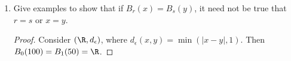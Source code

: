 \documentclass[12pt,letterpaper]{article}
\begin{document}
\begin{enumerate}
\begin{enumerate}
\begin{proof}
Observe that for any $(x', y')\in B_{\frac{\epsilon}{2}}\big((x,y)\big)$,  
\begin{align*}
d(x,x')+d(y,y') = d_p\big((x',y'),(x,y)\big) < \frac{\epsilon}{2},
\end{align*}
so $d(x,x')<\frac{\epsilon}{2}$ and $d(y,y')<\frac{\epsilon}{2}$. Now by the triangle inequality, 
$$d(x',y')\leq d(x', x) + d(x,y)+ d(y,y') = r+\epsilon\phantom{,}$$
and 
$$d(x',y') \geq d(x,y) - d(x', x) - d(y,y') = r-\epsilon,$$
so $d(x', y')\in B_\epsilon(r)$, which means that $d$ is continuous by the $\delta$-$\epsilon$ definition.
\end{proof}
\end{enumerate}

\item Give examples to show that if $B_r(x)=B_s(y)$, it need not be true that $r=s$ or $x=y$. 
\begin{proof}
Consider $(\R, d_\epsilon)$, where 
$d_\epsilon(x,y)=\min(|x-y|, 1)$. Then $B_0(100)=B_1(50)=\R$. 
\end{proof}
\end{enumerate}
\end{document}

